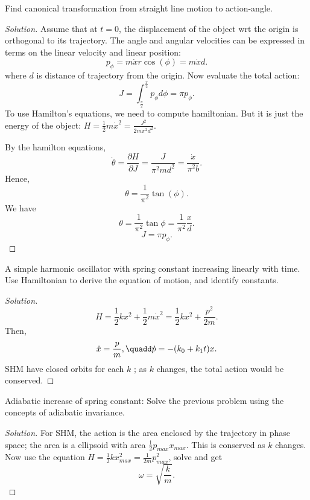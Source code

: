 
\begin{problem}
	Find canonical transformation from straight line motion to action-angle.
\end{problem}
\begin{proof}[Solution]
	Assume that at $t = 0$, the displacement of the object wrt the origin is orthogonal to its trajectory. The angle and angular velocities can be expressed in terms on the linear velocity and linear position:
	\[
		p_{\phi} = m \dot{x} r \cos(\phi) = m \dot{x} d
	.\] 
	where $d$ is distance of trajectory from the origin. Now evaluate the total action:
	\[
		J = \int _{\frac{\pi}{2}}^{\frac{\pi}{2}} p_{\phi} d \phi = \pi p_\phi
	.\] 
	To use Hamilton's equations, we need to compute hamiltonian. But it is just the energy of the object: $H = \frac{1}{2} m \dot{x}^2 = \frac{J^2}{ 2 m \pi^2 d^2}$.

	By the hamilton equations,
	\[
		\dot{\theta} = \frac{\partial H}{\partial J} = \frac{J}{\pi^2 m d^2} = \frac{\dot{x}}{\pi^2 b}
	.\] 
	Hence, 
	\[
		\theta = \frac{1}{\pi^2} \tan(\phi)
	.\] 
	We have
	\[
		\theta = \frac{1}{\pi^2} \tan \phi = \frac{1}{\pi^2} \frac{x}{d}
	.\] 
	\[
		J = \pi p_\phi
	.\] 
\end{proof}

\begin{problem}
	A simple harmonic oscillator with spring constant increasing linearly with time. Use Hamiltonian to derive the equation of motion, and identify constants.
\end{problem}
\begin{proof}[Solution]
	\[
		H = \frac{1}{2} k x^2 + \frac{1}{2} m \dot{x}^2 = \frac{1}{2} k x^2 + \frac{p^2}{ 2 m}
	.\] 
	Then, 
	\[
		\dot{x} = \frac{p}{m}, \quadd \dot{p} = - (k_0 + k_1 t) x
	.\] 
	SHM have closed orbits for each $k$ ; as $k$ changes, the total action would be conserved.
\end{proof}

\begin{problem}
	Adiabatic increase of spring constant: Solve the previous problem using the concepts of adiabatic invariance.
\end{problem}
\begin{proof}[Solution]
	For SHM, the action is the area enclosed by the trajectory in phase space; the area is a ellipsoid with area $\frac{1}{2} p_{max} x_{max}$. This is conserved as $k$ changes. Now use the equation $H = \frac{1}{2} k x_{max}^2 = \frac{1}{2 m} p_{max}^2$, solve and get 
	\[
		\omega = \sqrt{\frac{k}{m}} 
	.\] 
\end{proof}


